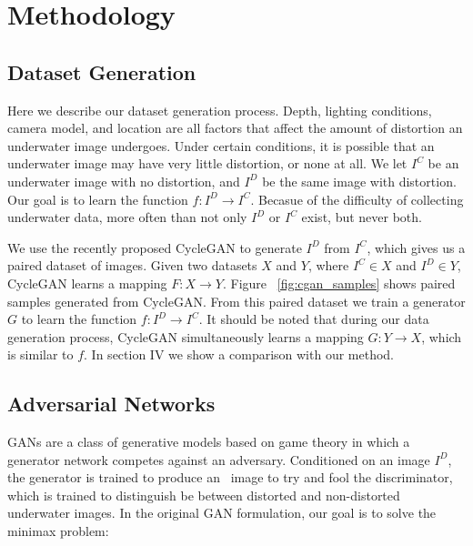 \section{Methodology}
\label{sec:methodology}

\subsection{Dataset Generation}
Here we describe our dataset generation process. Depth, lighting conditions, camera
model, and location are all factors that affect the amount of distortion an underwater image undergoes. Under certain
conditions, it is possible that an underwater image may have very little distortion, or none at all.
We let $I^C$ be an underwater image with no distortion, and $I^D$
be the same image with distortion. Our goal is to learn the function $f: I^D \rightarrow I^C$. Becasue of the
difficulty of collecting underwater data, more often than not only $I^D$ or $I^C$ exist, but never both.

We use the recently proposed CycleGAN \cite{zhu2017unpaired} to generate $I^D$ from $I^C$, which gives us a paired
dataset of images. Given two datasets $X$ and $Y$, where $I^C \in X$ and $I^D \in Y$, CycleGAN learns a mapping
$F: X \rightarrow Y$. Figure ~\ref{fig:cgan_samples} shows paired samples generated from CycleGAN. From this paired dataset we 
train a
generator $G$ to learn the function $f: I^D \rightarrow I^C$. It should be noted that during our data generation process,
CycleGAN simultaneously learns a mapping $G: Y \rightarrow X$, which is similar to $f$. In section IV we show a comparison with 
our method.

\subsection{Adversarial Networks}
GANs \cite{goodfellow2014generative} are a class of generative models based on game theory in which a generator
network competes against an adversary. Conditioned on an image $I^D$, the generator is trained to produce an \
image to try and fool the discriminator, which is trained to distinguish be between distorted and non-distorted
underwater images. In the original GAN formulation, our goal is to solve the minimax problem:

